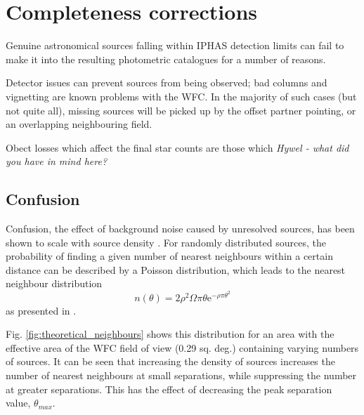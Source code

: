 \documentclass[a4paper,useAMS,usenatbib]{mn2e}
\begin{document}


\section[]{Completeness corrections} 
\label{sec:completeness}

Genuine astronomical sources falling within IPHAS detection limits can fail to
make it into the resulting photometric catalogues for a number of reasons.

Detector issues can prevent sources from being observed; bad columns and
vignetting are known problems with the WFC. In the majority of such cases (but not quite all),
missing sources will be picked up by the offset partner pointing, or an overlapping neighbouring 
field.

Obect losses which affect the final star counts are those which {\sl Hywel - what did you have in mind here?}

\subsection{Confusion}

Confusion, the effect of background noise caused by unresolved sources, has been shown to scale with source density \citep{Condon1974}. For randomly distributed sources, the probability of finding a given number of nearest neighbours within a certain distance can be described by a Poisson distribution, which leads to the nearest neighbour distribution 
\begin{equation}
n(\theta) = 2\rho^2\Omega\pi\theta\mathrm{e}^{-\rho\pi\theta^2}
\label{eq:theoretical_neighbours}
\end{equation}
\noindent as presented in \citet{Bahcall1986}.

Fig. \ref{fig:theoretical_neighbours} shows this distribution for an area with the effective area of the WFC field of view (0.29 sq. deg.) containing varying numbers of sources. It can be seen that increasing the density of sources increases the number of nearest neighbours at small separations, while
suppressing the number at greater separations. This has the effect of decreasing the peak separation value, $\theta_{max}$.
\end{document}
